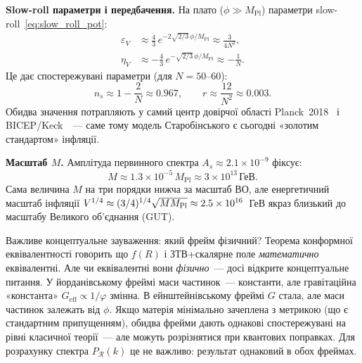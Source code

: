 \textbf{Slow-roll параметри і передбачення.}
На плато ($\phi \gg M_\mathrm{Pl}$) параметри slow-roll~\eqref{eq:slow_roll_pot}:
\begin{align}
  \varepsilon_V &\approx \frac{4}{3}\,e^{-2\sqrt{2/3}\,\phi/M_\mathrm{Pl}}
                \approx \frac{3}{4N^2}, \\
  \eta_V        &\approx -\frac{4}{3}\,e^{-\sqrt{2/3}\,\phi/M_\mathrm{Pl}}
                \approx -\frac{1}{N}.
\end{align}
Це дає спостережувані параметри (для $N = 50$--$60$):
\begin{equation}
  \boxed{n_s \approx 1 - \frac{2}{N} \approx 0.967,}
  \qquad
  \boxed{r \approx \frac{12}{N^2} \approx 0.003.}
\end{equation}
Обидва значення потрапляють у самий центр довірчої області
Planck~2018~\cite{planck_2018} і BICEP/Keck~\cite{bicep_keck_2021}~---
саме тому модель Старобінського є сьогодні «золотим стандартом» інфляції.

\medskip
\textbf{Масштаб $M$.}
Амплітуда первинного спектра $A_s \approx 2.1\times10^{-9}$ фіксує:
\begin{equation}
  M \approx 1.3\times10^{-5}\,M_\mathrm{Pl} \approx 3\times10^{13}\,\text{ГеВ}.
\end{equation}
Сама величина $M$ на три порядки нижча за масштаб ВО, але енергетичний масштаб інфляції
$V^{1/4} \approx (3/4)^{1/4}\sqrt{M M_{\rm Pl}} \approx 2.5\times10^{16}$~ГеВ
якраз близький до масштабу Великого об'єднання (GUT).

\begin{keybox}{Важливе концептуальне зауваження: який фрейм фізичний?}
Теорема конформної еквівалентності говорить що $f(R)$ і
ЗТВ+скалярне поле \emph{математично} еквівалентні.
Але чи еквівалентні вони \emph{фізично}~---
досі відкрите концептуальне питання.
У йорданівському фреймі маси частинок~--- константи,
але гравітаційна «константа» $G_\mathrm{eff}\propto 1/\varphi$ змінна.
В ейнштейнівському фреймі $G$ стала, але маси частинок залежать від $\phi$.
Якщо матерія мінімально зачеплена з метрикою (що є стандартним
припущенням), обидва фрейми дають однакові спостережувані
на рівні класичної теорії~--- але можуть розрізнятися
при квантових поправках.
Для розрахунку спектра $P_{\mathcal{R}}(k)$ це не важливо:
результат однаковий в обох фреймах.
\end{keybox}


